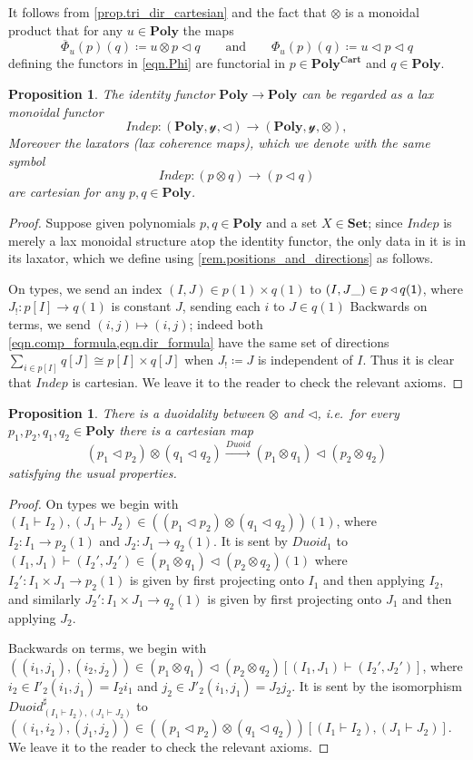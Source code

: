 \documentclass[11pt, one side, article]{memoir}
\theoremstyle{definition}
\theoremstyle{plain}
\newtheorem{proposition}[definitionx]{Proposition}
\newcommand{\Cat}[1]{\mathbf{#1}}%
\newcommand{\Fun}[1]{\mathit{#1}}%
\newcommand{\To}[2][]{\xrightarrow[#1]{#2}}
\newcommand{\ol}[1]{\overline{#1}}
\newcommand{\smset}{\Cat{Set}}
\newcommand{\yon}{\mathcal{y}}
\newcommand{\poly}{\Cat{Poly}}
\newcommand{\polycart}{\poly^{\Cat{Cart}}}
\newcommand{\0}{\textsf{0}}
\newcommand{\1}{\tn{\textsf{1}}}
\newcommand{\tri}{\mathbin{\triangleleft}}
\newcommand{\indep}{\Fun{Indep}}
\newcommand{\duoid}{\Fun{Duoid}}
\newcommand{\qqand}{\qquad\text{and}\qquad}
\begin{document}
It follows from \cref{prop.tri_dir_cartesian} and the fact that $\otimes$ is a monoidal product that for any $u\in\poly$ the maps
\[
	\ol{\Phi}_u(p)(q)\coloneqq u\otimes p\tri q
	\qqand
	\Phi_u(p)(q)\coloneqq u\tri p\tri q
\]
defining the functors in \eqref{eqn.Phi} are functorial in $p\in\polycart$ and $q\in\poly$.

\begin{proposition}\label{prop.indep}
The identity functor $\poly\to\poly$ can be regarded as a lax monoidal functor
\begin{equation}\label{eqn.indep}
	\indep\colon (\poly,\yon,\tri)\to(\poly,\yon,\otimes),
\end{equation}
Moreover the laxators (lax coherence maps), which we denote with the same symbol
\[\indep\colon (p\otimes q)\to (p\tri q)\]
are cartesian for any $p,q\in\poly$.
\end{proposition}
\begin{proof}
Suppose given polynomials $p,q\in\poly$ and a set $X\in\smset$; since $\indep$ is merely a lax monoidal structure atop the identity functor, the only data in it is in its laxator, which we define using \cref{rem.positions_and_directions} as follows.

On types, we send an index $(I,J)\in p(1)\times q(1)$ to $(I,J\_)\in p\tri q(\1)$, where $J_!\colon p[I]\to q(1)$ is constant $J$, sending each $i$ to $J\in q(1)$ Backwards on terms, we send $(i,j)\mapsto (i,j)$; indeed both \cref{eqn.comp_formula,eqn.dir_formula} have the same set of directions $\sum_{i\in p[I]}q[J]\cong p[I]\times q[J]$ when $J_!\coloneqq J$ is independent of $I$. Thus it is clear that $\indep$ is cartesian. We leave it to the reader to check the relevant axioms.
\end{proof}

\begin{proposition}\label{prop.duoidal}
There is a duoidality between $\otimes$ and $\tri$, i.e.\ for every $p_1,p_2,q_1,q_2\in\poly$ there is a cartesian map
\[
	(p_1\tri p_2)\otimes(q_1\tri q_2)\To{\duoid} (p_1\otimes q_1)\tri (p_2\otimes q_2)
\]
satisfying the usual properties.
\end{proposition}
\begin{proof}
On types we begin with $(I_1\vdash I_2),(J_1\vdash J_2)\in ((p_1\tri p_2)\otimes(q_1\tri q_2))(1)$, where $I_2\colon I_1\to p_2(1)$ and $J_2\colon J_1\to q_2(1)$. It is sent by $\duoid_1$ to $(I_1,J_1)\vdash(I_2',J_2')\in (p_1\otimes q_1)\tri (p_2\otimes q_2)(1)$ where $I_2'\colon I_1\times J_1\to p_2(1)$ is given by first projecting onto $I_1$ and then applying $I_2$, and similarly $J_2'\colon I_1\times J_1\to q_2(1)$ is given by first projecting onto $J_1$ and then applying $J_2$. 

Backwards on terms, we begin with $((i_1,j_1),(i_2,j_2))\in (p_1\otimes q_1)\tri (p_2\otimes q_2)[(I_1,J_1)\vdash(I_2',J_2')]$, where $i_2\in I'_2(i_1,j_1)=I_2 i_1$ and $j_2\in J'_2(i_1,j_1)=J_2 j_2$. It is sent by the isomorphism $\duoid^\sharp_{(I_1\vdash I_2),(J_1\vdash J_2)}$ to $((i_1,i_2),(j_1,j_2))\in ((p_1\tri p_2)\otimes(q_1\tri q_2))[(I_1\vdash I_2),(J_1\vdash J_2)]$. We leave it to the reader to check the relevant axioms.
\end{proof}
\end{document}
